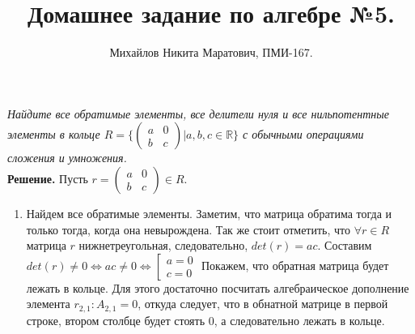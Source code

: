 \documentclass[a4paper, 12pt]{article}
\title{
     Домашнее задание по алгебре №5.
 }
\author{Михайлов Никита Маратович, ПМИ-167.
}
\date{}
\newcommand{\R}{\mathbb{R}}
\begin{document}
\maketitle
\begin{spacing}{1}


\begin{center}
\end{center}

\noindent \textit{Найдите все обратимые элементы, все делители нуля и все нильпотентные элементы в кольце $R = \{\begin{pmatrix}
	a & 0\\
	b & c
	\end{pmatrix} | a,b,c \in \R\}$ с обычными операциями сложения и умножения.}\\
\noindent \textbf{Решение.} Пусть $r = \begin{pmatrix} a & 0\\b & c \end{pmatrix} \in R$. 

\begin{enumerate}
\item
Найдем все обратимые элементы. Заметим, что матрица обратима тогда и только тогда, когда она невырождена. Так же стоит отметить, что $\forall r \in R$ матрица $r$ нижнетреугольная, следовательно, $det(r) = ac$. Составим $det(r)\neq 0 \Leftrightarrow ac \neq 0 \Leftrightarrow \left[\begin{array}{l}
a = 0\\c = 0
\end{array}\right.$ Покажем, что обратная матрица будет лежать в кольце. Для этого достаточно посчитать алгебраическое дополнение элемента $r_{2,1}:A_{2,1} = 0$, откуда следует, что в обнатной матрице в первой строке, втором столбце будет стоять 0, а следовательно лежать в кольце.


\end{enumerate}
\end{spacing}
\end{document}
